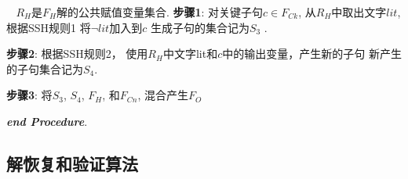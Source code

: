  $~~~~R_H$是$F_H$解的公共赋值变量集合.
\textbf{步骤1}:
对关键子句$c\in F_{Ck}$,
从$R_H$中取出文字$lit$,根据SSH规则1
将$\neg lit$加入到$c$
生成子句的集合记为$S_3$ .

\textbf{步骤2}:
根据SSH规则2，
使用$R_H$中文字lit和$c$中的输出变量，产生新的子句
新产生的子句集合记为$S_4$.

\textbf{步骤3}:
将$S_3$, $S_4$, $F_H$, 和$F_{Cn}$, 混合产生$F_O$

\textit{\textbf{end Procedure}}.
\subsection{解恢复和验证算法}\label{4:mappping}
%
%

